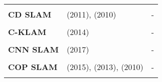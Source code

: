 \documentclass[a4paper,12pt]{scrartcl}
\begin{document}
{\begin{longtable}{l|l|l}
                           &                                                                                             &                                                                                                                              \\ [-3mm]
    \textbf{CD SLAM}       & \cite{Pirker2011} (2011), \cite{Pirker2010} (2010)                                          & -                                                                                                                            \\
                           &                                                                                             &                                                                                                                              \\ [-3mm]
    \textbf{C-KLAM}        & \cite{Nerurkar2014} (2014)                                                                  & -                                                                                                                            \\
                           &                                                                                             &                                                                                                                              \\ [-3mm]
    \textbf{CNN SLAM}      & \cite{Tateno2017} (2017)                                                                    & -                                                                                                                            \\
                           &                                                                                             &                                                                                                                              \\ [-3mm]
    \textbf{COP SLAM}      & \cite{Dubbelman2015} (2015), \cite{Dubbelman2013} (2013), \cite{Dubbelman2010} (2010)       & -                                                                                                                            \\
                           &                                                                                             &                                                                                                                              \\ [-3mm]

\end{longtable}}
\end{document}
